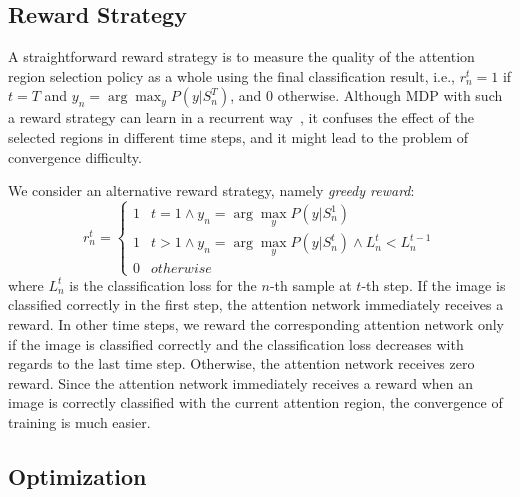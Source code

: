 \documentclass[10pt,twocolumn,letterpaper]{article}
\begin{document}
\subsection{Reward Strategy} \label{sec: reward}

A straightforward reward strategy is to measure the quality of the attention region selection policy as a whole using the final classification result, i.e., $r^t_n = 1$ if $t=T$ and $y_n=\arg\max_y P(y | S^T_n)$, and 0 otherwise.
Although MDP with such a reward strategy can learn in a recurrent way~\cite{mnih2014recurrent}, it confuses the effect of the selected regions in different time steps,
and it might lead to the problem of convergence difficulty.

We consider an alternative reward strategy, namely {\em greedy reward}:
\begin{equation}
r^t_n=\left\{
\begin{array}{cc}
1 & t = 1 \wedge y_n = \arg\max_y P(y | S^1_n) \\
1 & t > 1 \wedge y_{n} = \arg\max_y P(y | S^t_n) \wedge L^t_n < L^{t-1}_n \\
0 & otherwise \end{array}
\right.
\end{equation}
where $L^t_n$ is the classification loss for the $n$-th sample at $t$-th step. 
If the image is classified correctly in the first step, the attention network immediately receives a reward. 
In other time steps, we reward the corresponding attention network only if the image is classified correctly and the classification loss decreases with regards to the last time step.
Otherwise, the attention network receives zero reward.
Since the attention network immediately receives a reward when an image is correctly classified with the current attention region, the convergence of training is much easier.

\subsection{Optimization}
\end{document}
